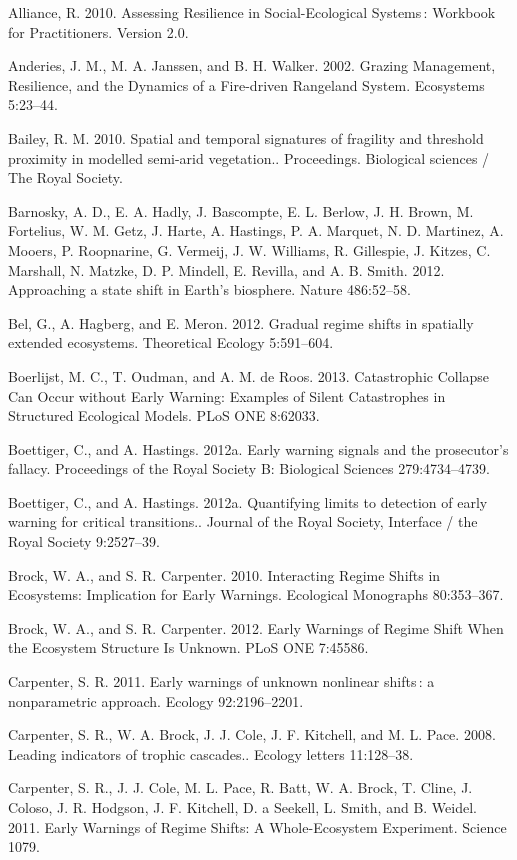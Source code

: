 \documentclass{article}
\begin{document}
Alliance, R. 2010. Assessing Resilience in Social-Ecological Systems :
Workbook for Practitioners. Version 2.0.

Anderies, J. M., M. A. Janssen, and B. H. Walker. 2002. Grazing
Management, Resilience, and the Dynamics of a Fire-driven Rangeland
System. Ecosystems 5:23--44.

Bailey, R. M. 2010. Spatial and temporal signatures of fragility and
threshold proximity in modelled semi-arid vegetation.. Proceedings.
Biological sciences / The Royal Society.

Barnosky, A. D., E. A. Hadly, J. Bascompte, E. L. Berlow, J. H. Brown,
M. Fortelius, W. M. Getz, J. Harte, A. Hastings, P. A. Marquet, N. D.
Martinez, A. Mooers, P. Roopnarine, G. Vermeij, J. W. Williams, R.
Gillespie, J. Kitzes, C. Marshall, N. Matzke, D. P. Mindell, E. Revilla,
and A. B. Smith. 2012. Approaching a state shift in Earth's biosphere.
Nature 486:52--58.

Bel, G., A. Hagberg, and E. Meron. 2012. Gradual regime shifts in
spatially extended ecosystems. Theoretical Ecology 5:591--604.

Boerlijst, M. C., T. Oudman, and A. M. de Roos. 2013. Catastrophic
Collapse Can Occur without Early Warning: Examples of Silent
Catastrophes in Structured Ecological Models. PLoS ONE 8:62033.

Boettiger, C., and A. Hastings. 2012a. Early warning signals and the
prosecutor's fallacy. Proceedings of the Royal Society B: Biological
Sciences 279:4734--4739.

Boettiger, C., and A. Hastings. 2012a. Quantifying limits to detection
of early warning for critical transitions.. Journal of the Royal
Society, Interface / the Royal Society 9:2527--39.

Brock, W. A., and S. R. Carpenter. 2010. Interacting Regime Shifts in
Ecosystems: Implication for Early Warnings. Ecological Monographs
80:353--367.

Brock, W. A., and S. R. Carpenter. 2012. Early Warnings of Regime Shift
When the Ecosystem Structure Is Unknown. PLoS ONE 7:45586.

Carpenter, S. R. 2011. Early warnings of unknown nonlinear shifts : a
nonparametric approach. Ecology 92:2196--2201.

Carpenter, S. R., W. A. Brock, J. J. Cole, J. F. Kitchell, and M. L.
Pace. 2008. Leading indicators of trophic cascades.. Ecology letters
11:128--38.

Carpenter, S. R., J. J. Cole, M. L. Pace, R. Batt, W. A. Brock, T.
Cline, J. Coloso, J. R. Hodgson, J. F. Kitchell, D. a Seekell, L. Smith,
and B. Weidel. 2011. Early Warnings of Regime Shifts: A Whole-Ecosystem
Experiment. Science 1079.
\end{document}
